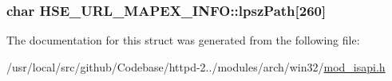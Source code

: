 \subsubsection[{\texorpdfstring{lpsz\+Path}{lpszPath}}]{\setlength{\rightskip}{0pt plus 5cm}char H\+S\+E\+\_\+\+U\+R\+L\+\_\+\+M\+A\+P\+E\+X\+\_\+\+I\+N\+F\+O\+::lpsz\+Path\mbox{[}260\mbox{]}}\hypertarget{structHSE__URL__MAPEX__INFO_a09e001fcf00e418a52c54c8c7773372f}{}\label{structHSE__URL__MAPEX__INFO_a09e001fcf00e418a52c54c8c7773372f}


The documentation for this struct was generated from the following file\+:\begin{DoxyCompactItemize}
\item 
/usr/local/src/github/\+Codebase/httpd-\/2../modules/arch/win32/\hyperlink{mod__isapi_8h}{mod\+\_\+isapi.\+h}\end{DoxyCompactItemize}
